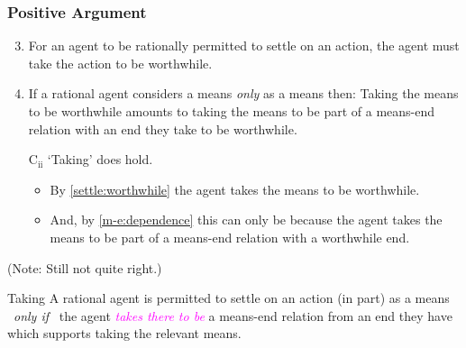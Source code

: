 \documentclass[noamssymb,
]{beamer} %
\newcommand{\hozlinedash}[0]{%
  \noindent\hdashrule[0.5ex][c]{\textwidth}{.1pt}{2.5pt}
}
\begin{document}
\begin{frame}
    \frametitle{Positive Argument}

  \begin{enumerate}
    \setcounter{enumi}{2}
  \item\label{settle:worthwhile} For an agent to be rationally permitted to settle on an action, the agent must take the action to be worthwhile.
  \item\label{m-e:dependence} If a rational agent considers a means \emph{only} as a means then: \newline Taking the means to be worthwhile amounts to taking the means to be part of a means-end relation with an end they take to be worthwhile.
    \item[C\(_{\text{ii}}\)] `Taking' does hold.
    \begin{itemize}
    \item By \ref{settle:worthwhile} the agent takes the means to be worthwhile.
    \item And, by \ref{m-e:dependence} this can only be because the agent takes the means to be part of a means-end relation with a worthwhile end.
    \end{itemize}
  \end{enumerate}

  (Note: Still not quite right.)

  \hozlinedash

  {\footnotesize
    \begin{block}{Taking}
      A rational agent is permitted to settle on an action (in part) as a means
      \newline
      \mbox{ }\hfill\emph{only if}\hfill\mbox{ }
      \newline
      the agent \textcolor{fuchsia}{\emph{takes there to be}}  a means-end relation from an end they have which supports taking the relevant means.
    \end{block}
  }
\end{frame}
\end{document}
